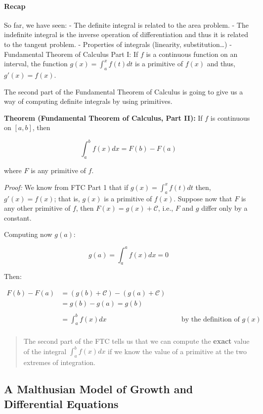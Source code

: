 \documentclass[11pt]{article}
\begin{document}
\hypertarget{recap}{%
\paragraph{Recap}\label{recap}}

So far, we have seen: - The definite integral is related to the area
problem. - The indefinite integral is the inverse operation of
differentiation and thus it is related to the tangent problem. -
Properties of integrals (linearity, substitution\ldots{}) - Fundamental
Theorem of Calculus Part I: If \(f\) is a continuous function on an
interval, the function \(g(x) = \int^x_a f(t) dt\) is a primitive of
\(f(x)\) and thus, \(g'(x) = f(x)\).

The second part of the Fundamental Theorem of Calculus is going to give
us a way of computing definite integrals by using primitives.

\textbf{Theorem (Fundamental Theorem of Calculus, Part II):} If \(f\) is
continuous on \([a,b]\), then

\[
\int^b_a f(x) dx = F(b) -  F(a)
\]

where \(F\) is any primitive of \(f\).

\emph{Proof:} We know from FTC Part 1 that if
\(g(x) = \int^x_a f(t) dt\) then, \(g'(x) = f(x)\); that is, \(g(x)\) is
a primitive of \(f(x)\). Suppose now that \(F\) is any other primitive
of \(f\), then \(F(x) = g(x) + \mathcal{C}\), i.e., \(F\) and \(g\)
differ only by a constant.

Computing now \(g(a)\):

\[
g(a) = \int^a_a f(x) dx = 0
\]

Then:

\begin{align}
F(b) - F(a) & = \left(g(b)+\mathcal{C}\right) - \left(g(a)+\mathcal{C}\right)  \ & \ & \ \\
& = g(b) - g(a) = g(b) \ & \ & \  \\ \\
& = \int^b_a f(x) dx \ & \ & \ \text{by the definition of $g(x)$} \\
\end{align}

\begin{quote}
The second part of the FTC tells us that we can compute the
\textbf{exact} value of the integral \(\int^b_a f(x) dx\) if we know the
value of a primitive at the two extremes of integration.
\end{quote}

    \hypertarget{a-malthusian-model-of-growth-and-differential-equations}{%
\subsection{A Malthusian Model of Growth and Differential
Equations}\label{a-malthusian-model-of-growth-and-differential-equations}}
\end{document}
